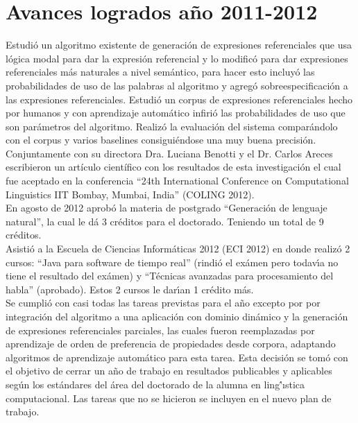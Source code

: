 \section{Avances logrados a\~no 2011-2012 }
\label{progreso}

Estudi\'o un algoritmo existente de generaci\'on de expresiones referenciales que usa l\'ogica modal para dar la 
expresi\'on referencial y lo modific\'o para dar expresiones referenciales m\'as naturales a nivel sem\'antico, para hacer 
esto incluy\'o las probabilidades de uso de las palabras al algoritmo y agreg\'o 
sobreespecificaci\'on a las expresiones referenciales. Estudi\'o un corpus de expresiones 
referenciales hecho por humanos y con aprendizaje autom\'atico infiri\'o las probabilidades de uso 
que son par\'ametros del algoritmo. Realiz\'o la evaluaci\'on del sistema compar\'andolo con el corpus 
y varios baselines consigui\'endose una muy buena precisi\'on. 
Conjuntamente con su directora Dra. Luciana Benotti y el Dr. Carlos Areces escribieron un art\'iculo cient\'ifico 
con los resultados de esta investigaci\'on el cual fue aceptado en la conferencia ``24th International Conference on Computational Linguistics IIT Bombay, Mumbai, India'' (COLING 2012).\\
En agosto de 2012 aprob\'o la materia de postgrado ``Generaci\'on de lenguaje natural'', la cual le d\'a 3 cr\'editos para el doctorado.
Teniendo un total de 9 cr\'editos.\\
Asisti\'o a la Escuela de Ciencias Inform\'aticas 2012 (ECI 2012) en donde realiz\'o 2 cursos: ``Java para software de tiempo real'' 
(rindi\'o el ex\'amen pero todav\'{\i}a no tiene el resultado del ex\'amen)
y ``T\'ecnicas avanzadas para procesamiento del habla'' (aprobado). Estos 2 cursos le dar\'{\i}an 1 cr\'edito m\'as.\\
Se cumpli\'o con casi todas las tareas previstas para el a\~no excepto por por integraci\'on del algoritmo a una aplicaci\'on con dominio din\'amico y la generaci\'on de expresiones referenciales parciales, las cuales fueron reemplazadas por aprendizaje de orden de preferencia de propiedades desde corpora, adaptando algoritmos de aprendizaje autom\'atico para esta tarea. Esta decisi\'on se tom\'o con el objetivo de cerrar un a\~no de trabajo en resultados publicables y aplicables seg\'un los est\'andares del \'area del doctorado de la alumna en ling\''{\i}stica computacional. Las tareas que no se hicieron se incluyen en el nuevo plan de trabajo.




